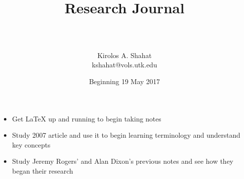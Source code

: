 \documentclass[letterpaper,index=totoc,hyperref,openany]{labbook} %
\title{
\begin{center}
\HRule \\[0.4cm]
{\Huge \bfseries Research Journal \\[0.4cm] %
\HRule \\[1.5cm]}
\end{center}
}
\author{\LARGE Kirolos A. Shahat \\ \Large kshahat@vols.utk.edu \\[2cm]} %
\date{Beginning 19 May 2017} %
\begin{document}
\frontmatter

\maketitle

\tableofcontents

\mainmatter %













\begin{itemize}
	\item Get LaTeX up and running to begin taking notes
	\item Study 2007 article and use it to begin learning terminology and understand key concepts
	\item Study Jeremy Rogers' and Alan Dixon's previous notes and see how they began their research
\end{itemize}
\end{document}
